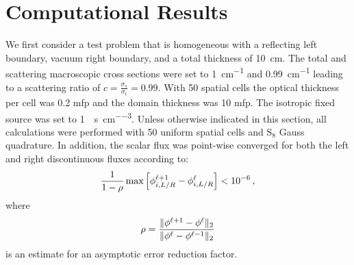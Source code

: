 
\section{Computational Results}


We first consider a test problem that is homogeneous with a reflecting left boundary, vacuum right boundary, and a total thickness of \SI{10}{cm}.  The total and scattering macroscopic cross sections were set to \SI{1}{cm^{-1}} and 
\SI{0.99}{cm^{-1}} leading to a scattering ratio of $c = \frac{\sigma_s}{\sigma_t}=0.99$. With 50 spatial cells the optical thickness per cell was 0.2 mfp and the domain thickness was 10 mfp. The isotropic fixed source was set to \SI{1}{\particles\per\second\per\cm\cubed}. 
Unless otherwise indicated in this section, all calculations were performed with 50 uniform spatial cells and S$_8$ Gauss quadrature. In addition, the scalar flux was point-wise converged for both the left and right discontinuous fluxes according to:
	\begin{equation} 
		\frac{1}{1 - \rho}\max\left[ \phi_{i,L/R}^{\ell+1} - \phi_{i,L/R}^\ell \right] < \num{e-6} \,,
	\end{equation}
where 
	\begin{equation}
		\rho = \frac{\| \phi^{\ell+1} - \phi^\ell \|_2}{\| \phi^\ell - \phi^{\ell-1} \|_2}
	\end{equation}
is an estimate for an asymptotic error reduction factor.

